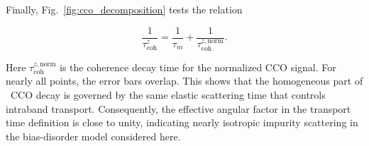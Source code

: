Finally, Fig.~\ref{fig:cco_decomposition} tests the relation

\begin{equation}
\frac{1}{\tau_{\mathrm{coh}}^z}
=
\frac{1}{\tau_m}
+
\frac{1}{\tau_{\mathrm{coh}}^{z,\mathrm{norm}}}.
\end{equation}

Here $\tau_{\mathrm{coh}}^{z,\mathrm{norm}}$ is the coherence decay time for the normalized CCO signal. For nearly all points, the error bars overlap. This shows that the homogeneous part of \, CCO decay is governed by the same elastic scattering time that controls intraband transport. Consequently, the effective angular factor in the transport time definition is close to unity, indicating nearly isotropic impurity scattering in the bias-disorder model considered here.